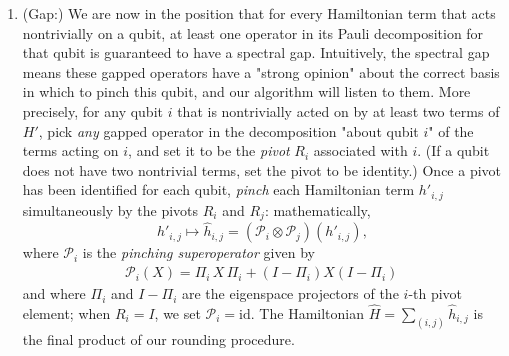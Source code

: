 \documentclass[a4paper,onecolumn,11pt]{quantumarticle}
\theoremstyle{plain}
\renewcommand{\cP}{\mathcal{P}}
\begin{document}
\begin{enumerate}
    \item (Gap:) We are now in the position that for every Hamiltonian term that acts nontrivially on a qubit, at least one operator in its Pauli decomposition for that qubit is guaranteed to have a spectral gap. Intuitively, the spectral gap means these gapped operators have a "strong opinion" about the correct basis in which to pinch this qubit, and our algorithm will listen to them. More precisely, for any qubit $i$ that is nontrivially acted on by at least two terms of $H'$, pick \emph{any} gapped operator in the decomposition "about qubit $i$" of the terms acting on $i$, and set it to be the \emph{pivot} $R_i$ associated with $i$. (If a qubit does not have two nontrivial terms, set the pivot to be identity.) Once a pivot has been identified for each qubit, \emph{pinch} each Hamiltonian term $h'_{i,j}$ simultaneously by the pivots $R_i$ and $R_j$: mathematically,
    \[ h'_{i,j} \mapsto \hat{h}_{i,j} = (\cP_i \otimes \cP_j)(h'_{i,j}),\]
    where $\cP_i$ is the \emph{pinching superoperator} given by
 \begin{align}\label{eq:pinching-superoperator-overview}
    \mathcal{P}_i(X) = \Pi_i \, X \, \Pi_i + (I-\Pi_i) X (I-\Pi_i)\, 
    \end{align}
and where $\Pi_i$ and $I-\Pi_i$ are the eigenspace projectors of the $i$-th pivot element; when $R_i=I$, we set $\mathcal{P}_i=\mathrm{id}$. The Hamiltonian $\hat{H} = \sum_{(i,j)} \hat{h}_{i,j}$ is the final product of our rounding procedure.


\end{enumerate}
\end{document}

